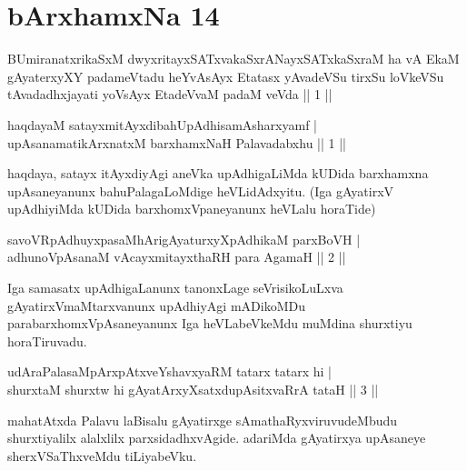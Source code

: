 \section*{bArxhamxNa 14}

\begin{shl}
BUmiranatxrikaSxM dwyxritayxSATxvakaSxrANayxSATxkaSxraM ha vA EkaM gAyaterxyXY padameVtadu heYvAsAyx Etatasx yAvadeVSu tirxSu loVkeVSu tAvadadhxjayati yoV\s sAyx EtadeVvaM padaM veVda || 1 ||
\end{shl}


\begin{shl}
haqdayaM satayxmitAyxdibahUpAdhisamAsharxyamf | \\
upAsanamatikArxnatxM barxhamxNaH Palavadabxhu \hfill ||  1 || 
\end{shl}

\begin{artha}
haqdaya, satayx itAyxdiyAgi aneVka upAdhigaLiMda kUDida barxhamxna 
upAsaneyanunx bahuPalagaLoMdige heVLidAdxyitu. (Iga gAyatirxV 
upAdhiyiMda kUDida barxhomxVpaneyanunx heVLalu horaTide)
\end{artha}

\begin{shl}
savoVRpAdhuyxpasaMhArigAyaturxyXpAdhikaM parxBoVH  | \\
adhunoVpAsanaM vAcayxmitayxthaRH para AgamaH \hfill ||  2 || 
\end{shl}

\begin{artha}
Iga samasatx upAdhigaLanunx tanonxLage seVrisikoLuLxva 
gAyatirxVmaMtarxvanunx upAdhiyAgi mADikoMDu parabarxhomxVpAsaneyanunx 
Iga heVLabeVkeMdu muMdina shurxtiyu horaTiruvadu.
\end{artha}


\begin{shl}
udAraPalasaMpArxpAtxveYshavxyaRM tatarx tatarx hi   | \\
shurxtaM shurxtw hi gAyatArxyXsatxdupAsitxvaRrA tataH \hfill ||  3 || 
\end{shl}

\begin{artha} 
mahatAtxda Palavu laBisalu gAyatirxge sAmathaRyxviruvudeMbudu 
shurxtiyalilx alalxlilx parxsidadhxvAgide. adariMda gAyatirxya 
upAsaneye sherxVSaThxveMdu tiLiyabeVku.
\end{artha}

